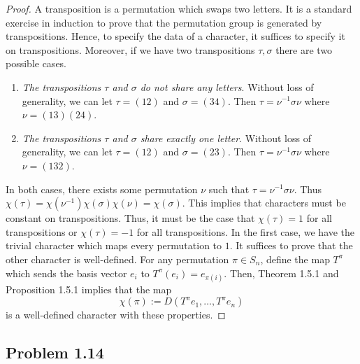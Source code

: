 \documentclass[12pt]{article}
\begin{document}
\begin{proof}
    A transposition is a permutation which swaps two letters. It is a standard exercise in induction to prove that the permutation group is generated by transpositions. Hence, to specify the data of a character, it suffices to specify it on transpositions. Moreover, if we have two transpositions $\tau, \sigma$ there are two possible cases. 
    \begin{enumerate}[label = (\roman*)]
        \item \textit{The transpositions $\tau$ and $\sigma$ do not share any letters}. Without loss of generality, we can let $\tau = (12)$ and $\sigma = (34)$. Then $\tau = \nu^{-1} \sigma \nu$ where $\nu = (13)(24)$. 
        \item \textit{The transpositions $\tau$ and $\sigma$ share exactly one letter}. Without loss of generality, we can let $\tau = (12)$ and $\sigma = (23)$. Then $\tau = \nu^{-1} \sigma \nu$ where $\nu = (132)$. 
    \end{enumerate}
    In both cases, there exists some permutation $\nu$ such that $\tau = \nu^{-1} \sigma \nu$. Thus $\chi(\tau) = \chi(\nu^{-1}) \chi(\sigma) \chi(\nu) = \chi(\sigma)$. This implies that characters must be constant on transpositions. Thus, it must be the case that $\chi(\tau) = 1$ for all transpositions or $\chi(\tau) = -1$ for all transpositions. In the first case, we have the trivial character which maps every permutation to $1$. It suffices to prove that the other character is well-defined. For any permutation $\pi \in S_n$, define the map $T^\pi$ which sends the basis vector $e_i$ to $T^\pi(e_i) = e_{\pi(i)}$. Then, Theorem 1.5.1 and Proposition 1.5.1 implies that the map 
    \[
    	\chi (\pi) := D(T^\pi e_1, \ldots, T^\pi e_n)
    \]
    is a well-defined character with these properties.
\end{proof}

\newpage 

\subsection{Problem 1.14}
\end{document}

